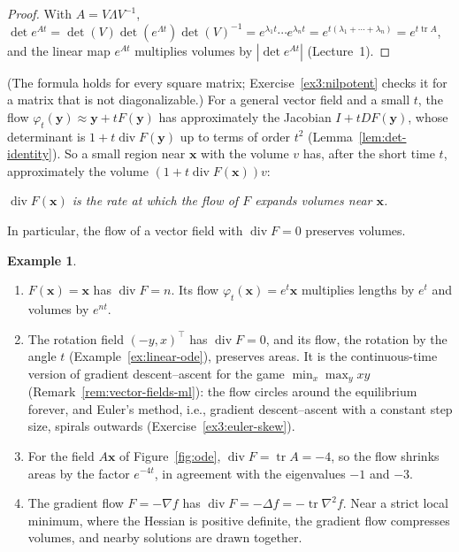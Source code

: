 \documentclass[11pt]{article}
\theoremstyle{definition}
\newtheorem{example}[definition]{Example}
\theoremstyle{plain}
\theoremstyle{remark}
\DeclareMathOperator{\tr}{tr}
\DeclareMathOperator{\Div}{div}
\begin{document}
\begin{proof}
    With $A = V\Lambda V^{-1}$, $\det e^{At} = \det(V)\det(e^{\Lambda t})\det(V)^{-1} = e^{\lambda_1 t}\cdots e^{\lambda_n t} = e^{t(\lambda_1 + \cdots + \lambda_n)} = e^{t\tr A}$, and the linear map $e^{At}$ multiplies volumes by $|\det e^{At}|$ (Lecture~1).
\end{proof}

(The formula holds for every square matrix; Exercise~\ref{ex3:nilpotent} checks it for a matrix that is not diagonalizable.) For a general vector field and a small $t$, the flow $\varphi_t(\mathbf{y}) \approx \mathbf{y} + tF(\mathbf{y})$ has approximately the Jacobian $I + tDF(\mathbf{y})$, whose determinant is $1 + t\Div F(\mathbf{y})$ up to terms of order $t^2$ (Lemma~\ref{lem:det-identity}). So a small region near $\mathbf{x}$ with the volume $v$ has, after the short time $t$, approximately the volume $(1 + t\Div F(\mathbf{x}))v$:
\begin{center}
    \emph{$\Div F(\mathbf{x})$ is the rate at which the flow of $F$ expands volumes near $\mathbf{x}$.}
\end{center}
In particular, the flow of a vector field with $\Div F = 0$ preserves volumes.

\begin{example}\label{ex:flow-volumes}
    \begin{enumerate}
        \item $F(\mathbf{x}) = \mathbf{x}$ has $\Div F = n$. Its flow $\varphi_t(\mathbf{x}) = e^t\mathbf{x}$ multiplies lengths by $e^t$ and volumes by $e^{nt}$.
        \item The rotation field $(-y, x)^\top$ has $\Div F = 0$, and its flow, the rotation by the angle $t$ (Example~\ref{ex:linear-ode}), preserves areas. It is the continuous-time version of gradient descent--ascent for the game $\min_x\max_y xy$ (Remark~\ref{rem:vector-fields-ml}): the flow circles around the equilibrium forever, and Euler's method, i.e., gradient descent--ascent with a constant step size, spirals outwards (Exercise~\ref{ex3:euler-skew}).
        \item For the field $A\mathbf{x}$ of Figure~\ref{fig:ode}, $\Div F = \tr A = -4$, so the flow shrinks areas by the factor $e^{-4t}$, in agreement with the eigenvalues $-1$ and $-3$.
        \item The gradient flow $F = -\nabla f$ has $\Div F = -\Delta f = -\tr\nabla^2 f$. Near a strict local minimum, where the Hessian is positive definite, the gradient flow compresses volumes, and nearby solutions are drawn together.
    \end{enumerate}
\end{example}
\end{document}
